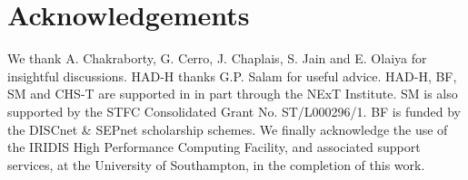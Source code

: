 \documentclass[12pt]{article}
\begin{document}
    \section{Acknowledgements}
We thank A. Chakraborty, 
G. Cerro, 
J. Chaplais, 
S. Jain and 
E. Olaiya for insightful discussions. HAD-H thanks
G.P. Salam for useful advice. 
HAD-H, BF, SM and CHS-T are supported in  in part through the NExT Institute.
SM is also supported by the STFC Consolidated
Grant No. ST/L000296/1. BF is funded by the DISCnet \& SEPnet scholarship schemes.
We finally 
acknowledge the use of the IRIDIS High Performance Computing Facility, and associated
support services, at the University of Southampton, in the completion of this work.

\printbibliography
\end{document}
